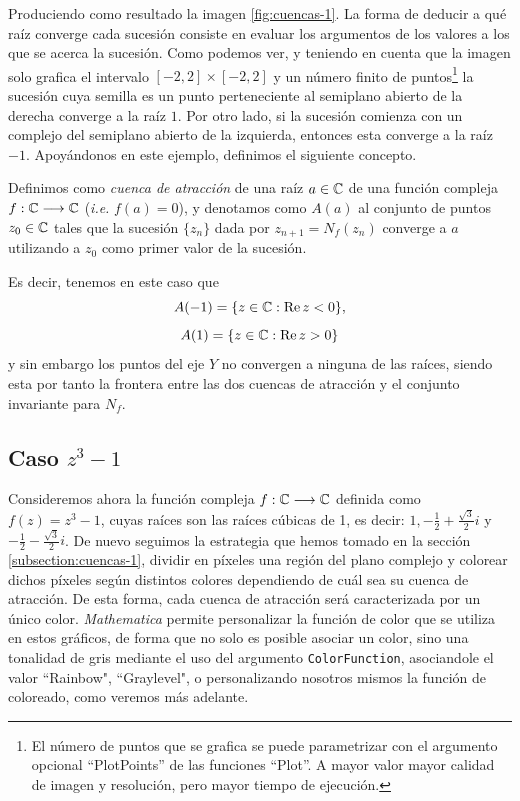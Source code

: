 Produciendo como resultado la imagen \ref{fig:cuencas-1}. La forma de deducir a qué raíz converge cada sucesión consiste en evaluar los argumentos de los valores a los que se acerca la sucesión. Como podemos ver, y teniendo en cuenta que la imagen solo grafica el intervalo $[-2,2]\times[-2,2]$ y un número finito de puntos\footnote{El número de puntos que se grafica se puede parametrizar con el argumento opcional ``PlotPoints'' de las funciones ``Plot''. A mayor valor mayor calidad de imagen y resolución, pero mayor tiempo de ejecución.} la sucesión cuya semilla es un punto perteneciente al semiplano abierto de la derecha converge a la raíz $1$. Por otro lado, si la sucesión comienza con un complejo del semiplano abierto de la izquierda, entonces esta converge a la raíz $-1$. Apoyándonos en este ejemplo, definimos el siguiente concepto.

\begin{definicion}
    Definimos como \textit{cuenca de atracción} de una raíz $a\in\mathbb{C}$ de una función compleja $f:\mathbb{C}\longrightarrow\mathbb{C}$ (\textit{i.e.} $f(a)=0$), y denotamos como $A(a)$ al conjunto de puntos $z_0\in\mathbb{C}$ tales que la sucesión $\{z_n\}$ dada por $z_{n+1}=N_f(z_n)$ converge a $a$ utilizando a $z_0$ como primer valor de la sucesión. 
\end{definicion}

Es decir, tenemos en este caso que
$$
A(-1)=\{z\in\mathbb{C}:\operatorname{Re}z<0\},
$$
$$
A(1)=\{z\in\mathbb{C}:\operatorname{Re} z>0\}
$$
y sin embargo los puntos del eje $Y$ no convergen a ninguna de las raíces, siendo esta por tanto la frontera entre las dos cuencas de atracción y el conjunto invariante para $N_f$.

\subsection{Caso $z^3-1$}

Consideremos ahora la función compleja $f:\mathbb{C}\longrightarrow\mathbb{C}$ definida como $f(z)=z^3-1$, cuyas raíces son las raíces cúbicas de 1, es decir: $1, -\frac{1}{2}+\frac{\sqrt{3}}{2}i$ y $-\frac{1}{2}-\frac{\sqrt{3}}{2}i$. De nuevo seguimos la estrategia que hemos tomado en la sección \ref{subsection:cuencas-1}, dividir en píxeles una región del plano complejo y colorear dichos píxeles según distintos colores dependiendo de cuál sea su cuenca de atracción. De esta forma, cada cuenca de atracción será caracterizada por un único color. \textit{Mathematica} permite personalizar la función de color que se utiliza en estos gráficos, de forma que no solo es posible asociar un color, sino una tonalidad de gris mediante el uso del argumento \verb|ColorFunction|, asociandole el valor ``Rainbow", ``Graylevel", o personalizando nosotros mismos la función de coloreado, como veremos más adelante.

